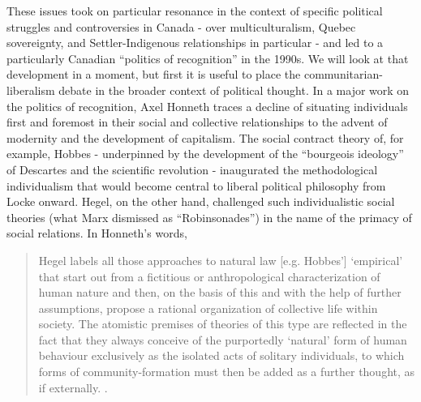 \documentclass[12pt,oneside]{memoir}
\begin{document}
These issues took on particular resonance in the context of specific political struggles and controversies in Canada - over multiculturalism, Quebec sovereignty, and Settler-Indigenous relationships in particular - and led to a particularly Canadian ``politics of recognition'' in the 1990s. We will look at that development in a moment, but first it is useful to place the communitarian-liberalism debate in the broader context of political thought.
In a major work on the politics of recognition, Axel Honneth traces a decline of situating individuals first and foremost in their social and collective relationships to the advent of modernity and the development of capitalism. The social contract theory of, for example, Hobbes - underpinned by the development of the ``bourgeois ideology'' of Descartes and the scientific revolution - inaugurated the methodological individualism that would become central to liberal political philosophy from Locke onward. Hegel, on the other hand, challenged such individualistic social theories (what Marx dismissed as ``Robinsonades'') in the name of the primacy of social relations. In Honneth's words, 

\begin{quote}

Hegel labels all those approaches to natural law [e.g. Hobbes'] `empirical' that start out from a fictitious or anthropological characterization of human nature and then, on the basis of this and with the help of further assumptions, propose a rational organization of collective life within society. The atomistic premises of theories of this type are reflected in the fact that they always conceive of the purportedly `natural' form of human behaviour exclusively as the isolated acts of solitary individuals, to which forms of community-formation must then be added as a further thought, as if externally. \citep[12]{honneth-struggle}. 

\end{quote}
\end{document}
